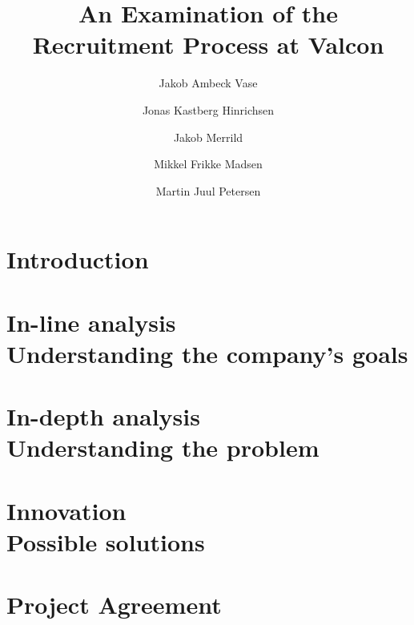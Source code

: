 \documentclass[hidelinks, a4paper]{report}
\begin{document}
\title{An Examination of the Recruitment Process at Valcon}
\author{Jakob Ambeck Vase \and Jonas Kastberg Hinrichsen \and Jakob Merrild \and Mikkel Frikke Madsen \and Martin Juul Petersen}
\listoftodos[Todos]
\maketitle
\tableofcontents
\chapter{Introduction}

\chapter{In-line analysis \\ Understanding the company's goals}

\chapter{In-depth analysis \\ Understanding the problem}

\chapter{Innovation \\ Possible solutions}


\appendix
\chapter{Project Agreement}

\end{document}
